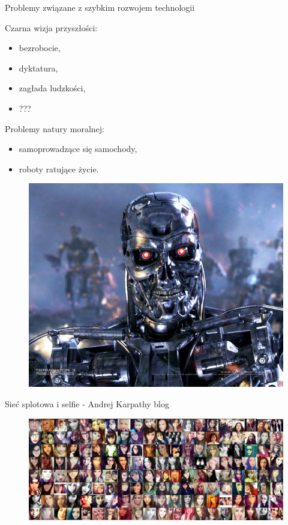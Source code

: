 \documentclass[xcolor=dvipsnames]{beamer}
\begin{document}
\begin{frame}{Problemy związane z szybkim rozwojem technologii}
	\begin{minipage}[t]{0.45\linewidth}
		Czarna wizja przyszłości:
		\begin{itemize}
			\item bezrobocie,
			\item dyktatura,
			\item zagłada ludzkości,
			\item ???
		\end{itemize}
		\vspace{5mm}	
		Problemy natury moralnej:
		\begin{itemize}
			\item samoprowadzące się samochody,
			\item roboty ratujące życie.
		\end{itemize}
	\end{minipage}%
	\hfill
	\begin{minipage}[t]{0.45\linewidth}
		\vfill
		\begin{figure}
			\includegraphics[width=\textwidth]{img/terminator.jpg} 
		\end{figure}
	\end{minipage}%
\end{frame}
\begin{frame}{Sieć splotowa i selfie - Andrej Karpathy blog}
  \begin{figure}
  	\includegraphics[width=\textwidth]{img/selfie.jpeg} 
  \end{figure}
\end{frame}
\end{document}
